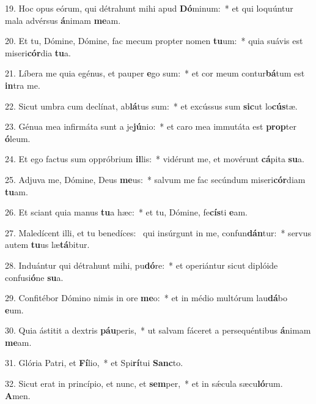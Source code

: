 19. Hoc opus eórum, qui détrahunt mihi apud \textbf{Dó}minum:~*  et qui loquúntur mala advérsus \textbf{á}nimam \textbf{me}am.\

20. Et tu, Dómine, Dómine, fac mecum propter nomen \textbf{tu}um:~*  quia suávis est miseri\textbf{cór}dia \textbf{tu}a.\

21. Líbera me quia egénus, et pauper \textbf{e}go sum:~*  et cor meum contur\textbf{bá}tum est \textbf{in}tra me.\

22. Sicut umbra cum declínat, ab\textbf{lá}tus sum:~*  et excússus sum \textbf{sic}ut lo\textbf{cús}tæ.\

23. Génua mea infirmáta sunt a je\textbf{jú}nio:~*  et caro mea immutáta est \textbf{prop}ter \textbf{ó}leum.\

24. Et ego factus sum oppróbrium \textbf{il}lis:~*  vidérunt me, et movérunt \textbf{cá}pita \textbf{su}a.\

25. Adjuva me, Dómine, Deus \textbf{me}us:~*  salvum me fac secúndum miseri\textbf{cór}diam \textbf{tu}am.\

26. Et sciant quia manus \textbf{tu}a hæc:~*  et tu, Dómine, fe\textbf{cís}ti \textbf{e}am.\

27. Maledícent illi, et tu benedíces: \dag\  qui insúrgunt in me, confun\textbf{dán}tur:~*  servus autem \textbf{tu}us læ\textbf{tá}bitur.\

28. Induántur qui détrahunt mihi, pu\textbf{dó}re:~*  et operiántur sicut diplóide confusi\textbf{ó}ne \textbf{su}a.\

29. Confitébor Dómino nimis in ore \textbf{me}o:~*  et in médio multórum lau\textbf{dá}bo \textbf{e}um.\

30. Quia ástitit a dextris \textbf{páu}peris,~*  ut salvam fáceret a persequéntibus \textbf{á}nimam \textbf{me}am.\

31. Glória Patri, et \textbf{Fí}lio,~*  et Spi\textbf{rí}tui \textbf{Sanc}to.\

32. Sicut erat in princípio, et nunc, et \textbf{sem}per,~*  et in sǽcula sæcu\textbf{ló}rum. \textbf{A}men.\

